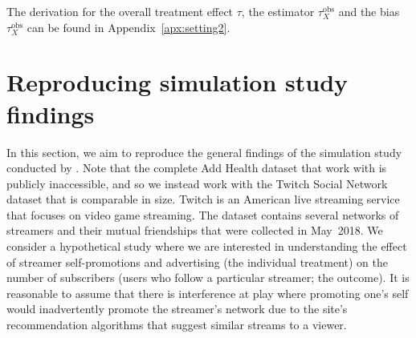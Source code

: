 \documentclass[10pt]{article}
\begin{document}
The derivation for the overall treatment effect $\tau$, the estimator $\tau_{X}^\text{obs}$ and the bias $\tau_{X}^\text{obs}$ can be found in Appendix~\ref{apx:setting2}.

\iffalse
The overall treatment effect $\tau$ in this setting is given by
\[
\tau = \frac{1}{4}\sum_{g,x\in\{0,1\}} \left(\E\left[Y_{ij}|Z_{ij}=1,G_{ij}=g,X_{ij}=x\right] - \E\left[Y_{ij}|Z_{ij}=0,G_{ij}=g,X_{ij}=x\right]\right) \;.
\]
Using Theorem~2.A, it can be shown that the naive estimator $\tau_{X}^\text{obs}$ that assumes SUTVA estimates the same quantity
\[
\tau_{X}^\text{obs} = \frac{1}{4}\sum_{x,g\in\{0,1\}}\left(\E\left[Y_{ij}|Z_{ij}=1,X_{ij}=x,G_{ij}=g\right] - \E\left[Y_{ij}|Z_{ij}=0,X_{ij}=x,G_{ij}=g\right]\right) \;.
\]
It then follows from the above that $\tau_{X}^\text{obs}-\tau = 0$.
\fi
\iffalse
and Assumptions~1 and 3 that
\begin{align*}
&\tau_{X}^\text{obs}-\tau \\
&= \tau_{X}^\text{obs} - \frac{1}{2}\left(\mu(1,0) + \mu(1,1) - \mu(0,0) - \mu(0,1)\right) \\
&= \tau_{X}^\text{obs} - \frac{1}{2}\sum_{x\in\{0,1\}}\left(\E\left[Y_{ij}|Z_{ij}=1,X_{ij}=x,G_{ij}=0\right] + \E\left[Y_{ij}|Z_{ij}=1,X_{ij}=x,G_{ij}=1\right]\right. \\
&\quad - \left.\E\left[Y_{ij}|Z_{ij}=0,X_{ij}=x,G_{ij}=0\right] - \E\left[Y_{ij}|Z_{ij}=0,X_{ij}=x,G_{ij}=1\right]\right)\P(X_{ij}=x) \\
&= 0 \;.
\end{align*}
\fi
\iffalse
Therefore, an unbiased estimator of the naive effect estimator is also unbiased for the treatment effect when the individual and neighbourhood treatments are conditionally independent given the set of covariates.
\\
\fi


\section{Reproducing simulation study findings} \label{sec:replication}

In this section, we aim to reproduce the general findings of the simulation study conducted by \textcite{Forastiere:2021}. Note that the complete Add Health dataset that \citeauthor{Forastiere:2021} work with is publicly inaccessible, and so we instead work with the Twitch Social Network dataset \parencite{Rozemberczki:2021} that is comparable in size. Twitch is an American live streaming service that focuses on video game streaming. The dataset contains several networks of streamers and their mutual friendships that were collected in May~2018. We consider a hypothetical study where we are interested in understanding the effect of streamer self-promotions and advertising (the individual treatment) on the number of subscribers (users who follow a particular streamer; the outcome). It is reasonable to assume that there is interference at play where promoting one's self would inadvertently promote the streamer's network due to the site's recommendation algorithms that suggest similar streams to a viewer.
\\
\end{document}

